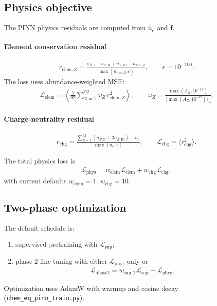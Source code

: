 \documentclass[11pt]{article}
\begin{document}
\subsection{Physics objective}
The PINN physics residuals are computed from $\hat{n}_e$ and $\hat{\bm{f}}$.

\paragraph{Element conservation residual}
\begin{align}
    r_{\mathrm{elem},Z}
    = \frac{
        n_{Z,\mathrm{I}} + n_{Z,\mathrm{II}} + n_{Z,\mathrm{III}} - n_{\mathrm{nuc},Z}
    }{
        \max(n_{\mathrm{nuc},Z},\epsilon)
    },
    \qquad \epsilon = 10^{-100}.
\end{align}
The loss uses abundance-weighted MSE:
\begin{align}
    \mathcal{L}_{\mathrm{elem}}
    = \left\langle
    \frac{1}{92}\sum_{Z=1}^{92}\omega_Z\,r_{\mathrm{elem},Z}^2
    \right\rangle, \qquad
    \omega_Z = \frac{\max(A_Z,10^{-12})}{\langle \max(A_Z,10^{-12})\rangle_Z}.
\end{align}

\paragraph{Charge-neutrality residual}
\begin{align}
    r_{\mathrm{chg}}
    = \frac{
        \sum_{Z=1}^{92}\left(n_{Z,\mathrm{II}}+2n_{Z,\mathrm{III}}\right)-n_e
    }{
        \max(n_e,\epsilon)
    },
    \qquad
    \mathcal{L}_{\mathrm{chg}}=\langle r_{\mathrm{chg}}^2\rangle.
\end{align}

The total physics loss is
\begin{align}
    \mathcal{L}_{\mathrm{phys}}
    = w_{\mathrm{elem}}\mathcal{L}_{\mathrm{elem}} + w_{\mathrm{chg}}\mathcal{L}_{\mathrm{chg}},
\end{align}
with current defaults $w_{\mathrm{elem}}=1$, $w_{\mathrm{chg}}=10$.

\subsection{Two-phase optimization}
The default schedule is:
\begin{enumerate}[leftmargin=1.5em]
    \item supervised pretraining with $\mathcal{L}_{\mathrm{sup}}$;
    \item phase-2 fine tuning with either $\mathcal{L}_{\mathrm{phys}}$ only or
    \begin{align}
        \mathcal{L}_{\mathrm{phase2}}
        = w_{\mathrm{sup,2}}\mathcal{L}_{\mathrm{sup}} + \mathcal{L}_{\mathrm{phys}}.
    \end{align}
\end{enumerate}
Optimization uses AdamW with warmup and cosine decay (\texttt{chem\_eq\_pinn\_train.py}).
\end{document}
